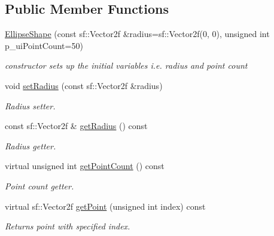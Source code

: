 \subsection*{Public Member Functions}
\begin{DoxyCompactItemize}
\item 
\mbox{\label{class_ellipse_shape_a095a9119b9c505cfddd2d7a908aaa2fa}} 
\hyperlink{class_ellipse_shape_a095a9119b9c505cfddd2d7a908aaa2fa}{Ellipse\+Shape} (const sf\+::\+Vector2f \&radius=sf\+::\+Vector2f(0, 0), unsigned int p\+\_\+ui\+Point\+Count=50)
\begin{DoxyCompactList}\small\item\em constructor sets up the initial variables i.\+e. radius and point count \end{DoxyCompactList}\item 
\mbox{\label{class_ellipse_shape_a7985921507ea04620ea7e2affb1871ec}} 
void \hyperlink{class_ellipse_shape_a7985921507ea04620ea7e2affb1871ec}{set\+Radius} (const sf\+::\+Vector2f \&radius)
\begin{DoxyCompactList}\small\item\em Radius setter. \end{DoxyCompactList}\item 
\mbox{\label{class_ellipse_shape_a539f2728e967a2111e41e157467764c4}} 
const sf\+::\+Vector2f \& \hyperlink{class_ellipse_shape_a539f2728e967a2111e41e157467764c4}{get\+Radius} () const
\begin{DoxyCompactList}\small\item\em Radius getter. \end{DoxyCompactList}\item 
\mbox{\label{class_ellipse_shape_ad9afe1dc2ce0e24a2af6bec2999aeb6b}} 
virtual unsigned int \hyperlink{class_ellipse_shape_ad9afe1dc2ce0e24a2af6bec2999aeb6b}{get\+Point\+Count} () const
\begin{DoxyCompactList}\small\item\em Point count getter. \end{DoxyCompactList}\item 
\mbox{\label{class_ellipse_shape_ab922b1ae42b7896b7d01d8d8d4759d65}} 
virtual sf\+::\+Vector2f \hyperlink{class_ellipse_shape_ab922b1ae42b7896b7d01d8d8d4759d65}{get\+Point} (unsigned int index) const
\begin{DoxyCompactList}\small\item\em Returns point with specified index. \end{DoxyCompactList}\end{DoxyCompactItemize}


